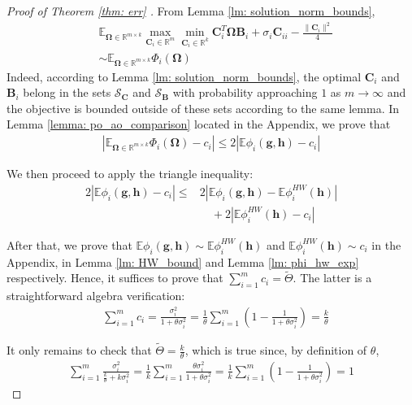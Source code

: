 \documentclass[conference]{IEEEtran}
\newcommand{\tTheta}{\tilde{\Theta}}
\newcommand{\bB}{\mathbf{B}}
\newcommand{\bC}{\mathbf{C}}
\newcommand{\bbE}{\mathbb{E}}
\newcommand{\calS}{\mathcal{S}}
\begin{document}
\begin{proof}[Proof of Theorem \ref{thm: err} ]
From Lemma \ref{lm: solution_norm_bounds},
 \begin{align*}
 & \bbE_{\boldsymbol{\Omega} \in \mathbb{R}^{m \times k}}  \max_{\mathbf{C}_i \in \mathbb{R}^m} \min_{\mathbf{C}_i \in \mathbb{R}^k} \mathbf{C}_i^T \boldsymbol{\Omega} \mathbf{B}_i + \sigma_i\mathbf{C}_{ii}- \frac{\|\mathbf{C}_i\|^2}{4} \\
 & \sim \mathbb{E}_{\boldsymbol{\Omega} \in \mathbb{R}^{m \times k}} \Phi_i(\boldsymbol{\Omega}) 
 \end{align*}
Indeed, according to Lemma \ref{lm: solution_norm_bounds}, the optimal $\bC_i$ and $\bB_i$ belong in the sets $\calS_{\bC}$ and $\calS_{\bB}$ with probability approaching $1$ as $m \to \infty$ and the objective is bounded outside of these sets according to the same lemma. In Lemma \ref{lemma: po_ao_comparison} located in the Appendix, we prove that 
\begin{align*}
\left|\mathbb{E}_{\boldsymbol{\Omega} \in \mathbb{R}^{m \times k}} \Phi_i(\boldsymbol{\Omega}) - c_i\right| \le 2\left| \mathbb{E} \phi_i(\mathbf{g},\mathbf{h}) - c_i\right|
\end{align*}

We then proceed to apply the triangle inequality:
\begin{align*}
2\left|\mathbb{E} \phi_i(\mathbf{g},\mathbf{h}) - c_i\right|  \le & 2 |\mathbb{E} \phi_i(\mathbf{g},\mathbf{h}) - \mathbb{E}\phi^{HW}_i(\mathbf{h})| \nonumber\\
&\quad + 2\left| \mathbb{E} \phi^{HW}_i(\mathbf{h}) - c_i\right| \nonumber
\end{align*}

After that, we prove that $\mathbb{E} \phi_i(\mathbf{g},\mathbf{h}) \sim \mathbb{E} \phi^{HW}_i(\mathbf{h})$ and $ \mathbb{E} \phi^{HW}_i(\mathbf{h}) \sim c_i$ in the Appendix, in Lemma \ref{lm: HW_bound} and Lemma \ref{lm: phi_hw_exp} respectively. Hence, it suffices to prove that $ \sum_{i=1}^m c_i = \tTheta$. The latter is a straightforward algebra verification:
\begin{align*}
    & \sum_{i=1}^m c_i = \frac{\sigma_i^2}{1 +\theta  \sigma_i^2} = \frac{1}{\theta}\sum_{i=1}^m \left(1 - \frac{1}{1 +\theta  \sigma_i^2}\right) = \frac{k}{\theta}
\end{align*}

It only remains to check that $\tTheta = \frac{k}{\theta}$, which is true since, by definition of $\theta$,
\begin{align*}
    \sum_{i=1}^m \frac{\sigma_i^2}{\frac{k}{\theta} + k\sigma_i^2 } = \frac{1}{k} \sum_{i=1}^m \frac{\theta\sigma_i^2}{1 + \theta\sigma_i^2} =\frac{1}{k} \sum_{i=1}^m \left(1 - \frac{1}{1 + \theta\sigma_i^2}\right) = 1 
\end{align*}




\end{proof}
\end{document}
